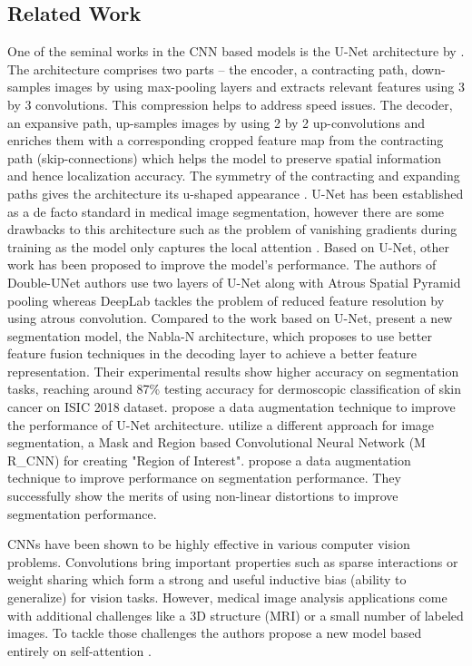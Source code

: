 \subsection{Related Work}
One of the seminal works in the CNN based models is the U-Net architecture by \citep{unet-2015-ronneberger}. The architecture comprises two parts – the encoder, a contracting path, down-samples images by using max-pooling layers and extracts relevant features using 3 by 3 convolutions. This compression helps to address speed issues. The decoder, an expansive path, up-samples images by using 2 by 2 up-convolutions and enriches them with a corresponding cropped feature map from the contracting path (skip-connections) which helps the model to preserve spatial information and hence localization accuracy. The symmetry of the contracting and expanding paths gives the architecture its u-shaped appearance \citep{unet-2015-ronneberger}. U-Net has been established as a de facto standard in medical image segmentation, however there are some drawbacks to this architecture such as  the problem of vanishing gradients during training as the model only captures the local attention \citep{transformers-2020-dosovitskiy}. Based on U-Net, other work has been proposed to improve the model’s performance. The authors of Double-UNet authors \citep{double_unet-2020-jha} use two layers of U-Net along with Atrous Spatial Pyramid pooling whereas DeepLab \citep{deeplab-2016-chen} tackles the problem of reduced feature resolution by using atrous convolution. Compared to the work based on U-Net, \citep{nabla-2019-alom} present a new segmentation model, the Nabla-N architecture, which proposes to use better feature fusion techniques in the decoding layer to achieve a better feature representation. Their experimental results show higher accuracy on segmentation tasks, reaching around 87\% testing accuracy for dermoscopic classification of skin cancer on ISIC 2018 dataset. \citep{data_purification-2019-bisla} propose a data augmentation technique to improve the performance of U-Net architecture. \citep{melonama_diagnosis-2021-codella} utilize a different approach for image segmentation, a Mask and Region based Convolutional Neural Network (M R\_CNN) for creating "Region of Interest". \citep{ensambles-2016-codella} propose a data augmentation technique to improve performance on segmentation performance. They successfully show the merits of using non-linear distortions to improve segmentation performance.

\par
CNNs have been shown to be highly effective in various computer vision problems. Convolutions bring important properties such as sparse interactions or weight sharing which form a strong and useful inductive bias (ability to generalize) for vision tasks. However, medical image analysis applications come with additional challenges like a 3D structure (MRI) or a small number of labeled images. To tackle those challenges the authors propose a new model based entirely on self-attention \citep{convolution_free-2021-karimi}.

